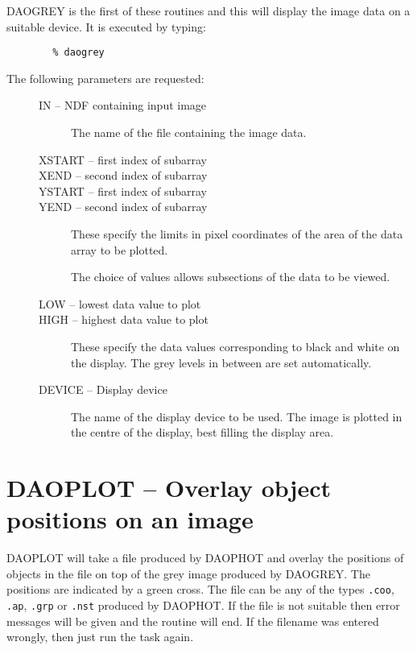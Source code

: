 DAOGREY is the first of these routines and this will display the image data on a
suitable device. 
It is executed by typing:

\begin{verbatim}
        % daogrey
\end{verbatim}

The following parameters are requested:

\begin{description}
\item[\mbox{}]\mbox{}
\begin{description}
\item[IN -- NDF containing input image] 
The name of the file containing the image data.
\item[XSTART -- first index of subarray]
\item[XEND  -- second index of subarray] 
\item[YSTART -- first index of subarray]
\item[YEND  -- second index of subarray] 

These specify the limits in pixel coordinates of the area of the data array to
be plotted.

The choice of values allows subsections of the data to be viewed.

\item[LOW -- lowest data value to plot] 
\item[HIGH -- highest data value to plot] 

These specify the data values corresponding to black and white on the display.
The grey levels in between are set automatically.

\item[DEVICE -- Display device] 

The name of the display device to be used.
The image is plotted in the centre of the display, best filling the display
area.

\end{description}
\end{description}

\section{DAOPLOT -- Overlay object positions on an image}
\label{sec:daoplot}

DAOPLOT will take a file produced by DAOPHOT and overlay the positions of objects
in the file on top of the grey image produced by DAOGREY. The positions are
indicated by a green cross. The file can be any of the types {\tt .coo}, {\tt .ap},
{\tt .grp} or {\tt .nst} produced by DAOPHOT. If the file is not suitable then
error messages will be given and the routine will end. If the filename was entered
wrongly, then just run the task again. 

